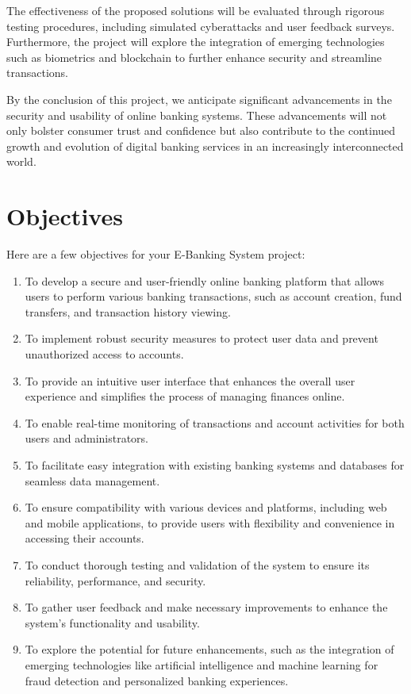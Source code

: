 The effectiveness of the proposed solutions will be evaluated through
rigorous testing
procedures, including simulated cyber\-attacks and user feedback
surveys. Furthermore, the
project will explore the integration of emerging technologies such as
biometrics and
blockchain to further enhance security and streamline transactions.

By the conclusion of this project, we anticipate significant
advancements in the security and
usability of online banking systems. These advancements will not only
bolster consumer
trust and confidence but also contribute to the continued growth and
evolution of digital
banking services in an increasingly interconnected world.

\chapter{Objectives}

Here are a few objectives for your E-Banking System project:
\begin{enumerate}
  \item To develop a secure and user-friendly online banking platform
    that allows users to
    perform various banking transactions, such as account creation,
    fund transfers, and
    transaction history viewing.
  \item To implement robust security measures to protect user data
    and prevent unauthorized
    access to accounts.
  \item To provide an intuitive user interface that enhances the
    overall user experience and
    simplifies the process of managing finances online.
  \item To enable real-time monitoring of transactions and account
    activities for both users
    and administrators.
  \item To facilitate easy integration with existing banking systems
    and databases for
    seamless data management.
  \item To ensure compatibility with various devices and platforms,
    including web and
    mobile applications, to provide users with flexibility and
    convenience in accessing their
    accounts.
  \item To conduct thorough testing and validation of the system to
    ensure its reliability,
    performance, and security.
  \item To gather user feedback and make necessary improvements to
    enhance the system's
    functionality and usability.
  \item To explore the potential for future enhancements, such as the
    integration of
    emerging technologies like artificial intelligence and machine
    learning for fraud detection
    and personalized banking experiences.
\end{enumerate}

